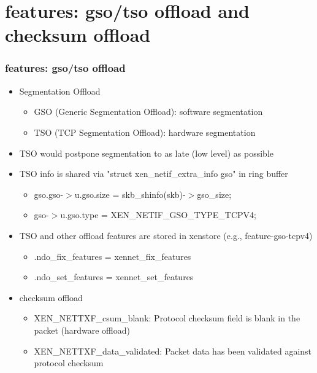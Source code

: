 \documentclass[aspectratio=169]{beamer}
\begin{document}
\section{features: gso/tso offload and checksum offload}
\begin{frame}
\frametitle{features: gso/tso offload}
\begin{itemize}
\item {\large Segmentation Offload}
	\begin{itemize}
		\item GSO (Generic Segmentation Offload): software segmentation
		\item TSO (TCP Segmentation Offload): hardware segmentation
	\end{itemize} \pause
\item {\large TSO would postpone segmentation to as late (low level) as possible} \pause
\item {\large TSO info is shared via "struct xen\_netif\_extra\_info gso" in ring buffer}
	\begin{itemize}
		\item gso.gso-$>$u.gso.size = skb\_shinfo(skb)-$>$gso\_size;
		\item gso-$>$u.gso.type = XEN\_NETIF\_GSO\_TYPE\_TCPV4;
	\end{itemize} \pause
\item {\large TSO and other offload features are stored in xenstore (e.g., feature-gso-tcpv4)}
	\begin{itemize}
		\item .ndo\_fix\_features = xennet\_fix\_features
		\item .ndo\_set\_features = xennet\_set\_features
	\end{itemize} \pause
\item {\large checksum offload}
	\begin{itemize}
		\item XEN\_NETTXF\_csum\_blank: Protocol checksum field is blank in the packet (hardware offload)
		\item XEN\_NETTXF\_data\_validated: Packet data has been validated against protocol checksum
	\end{itemize}
\end{itemize}
\end{frame}

\end{document}
